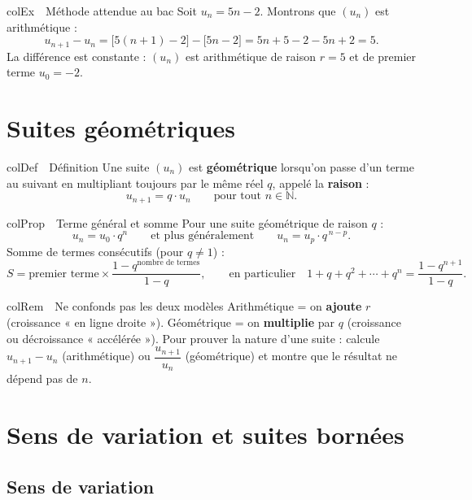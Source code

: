 \documentclass[11pt,a4paper]{article}
\newenvironment{definition}[1][Définition]
  {\begin{fiche}{colDef}{\ding{110}~~#1}}{\end{fiche}}
\newenvironment{propriete}[1][Propriété]
  {\begin{fiche}{colProp}{\ding{72}~~#1}}{\end{fiche}}
\newenvironment{exemple}[1][Exemple]
  {\begin{fiche}{colEx}{\ding{217}~~#1}}{\end{fiche}}
\newenvironment{remarque}[1][Remarque]
  {\begin{fiche}{colRem}{\ding{43}~~#1}}{\end{fiche}}
\begin{document}
\begin{exemple}[Méthode attendue au bac]
Soit $u_n = 5n - 2$. Montrons que $(u_n)$ est arithmétique :
\[
  u_{n+1} - u_n = \bigl[5(n+1) - 2\bigr] - \bigl[5n - 2\bigr] = 5n + 5 - 2 - 5n + 2 = 5.
\]
La différence est constante : $(u_n)$ est arithmétique de raison $r = 5$ et de premier terme $u_0 = -2$.
\end{exemple}

\section{Suites géométriques}

\begin{definition}
Une suite $(u_n)$ est \textbf{géométrique} lorsqu'on passe d'un terme au suivant en multipliant toujours par le même réel $q$, appelé la \textbf{raison} :
\[
  u_{n+1} = q \cdot u_n \qquad \text{pour tout } n \in \mathbb{N}.
\]
\end{definition}

\begin{propriete}[Terme général et somme]
Pour une suite géométrique de raison $q$ :
\[
  u_n = u_0 \cdot q^n
  \qquad\text{et plus généralement}\qquad
  u_n = u_p \cdot q^{\,n-p}.
\]
Somme de termes consécutifs (pour $q \neq 1$) :
\[
  S = \text{premier terme} \times \frac{1 - q^{\text{nombre de termes}}}{1 - q},
  \qquad\text{en particulier}\quad
  1 + q + q^2 + \cdots + q^n = \frac{1 - q^{n+1}}{1 - q}.
\]
\end{propriete}

\begin{remarque}[Ne confonds pas les deux modèles]
Arithmétique = on \textbf{ajoute} $r$ (croissance « en ligne droite »). Géométrique = on \textbf{multiplie} par $q$ (croissance ou décroissance « accélérée »). Pour prouver la nature d'une suite : calcule $u_{n+1} - u_n$ (arithmétique) ou $\dfrac{u_{n+1}}{u_n}$ (géométrique) et montre que le résultat ne dépend pas de $n$.
\end{remarque}

\section{Sens de variation et suites bornées}

\subsection{Sens de variation}
\end{document}

